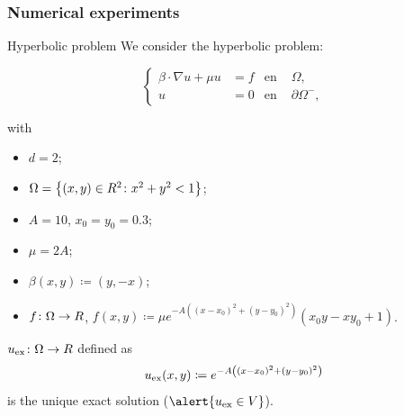 \subsubsection{Numerical experiments}
\begin{frame}{Hyperbolic problem}
	\scriptsize
	We consider the hyperbolic problem:
	\begin{block}{}
	\begin{equation*}
	\left\{
	\begin{aligned}
	\beta\cdot\nabla u+\mu u&=f & \text{en } &\Omega, \\
	u&=0 & \text{en } &\partial\Omega^-,
	\end{aligned}
	\right.
	\end{equation*}
	\end{block}
	with
	\begin{itemize}
		\item $d=2$;
		\item $\Omega=\left\{(x,y)\in\relax R^2\colon x^2+y^2<1 \right\}$;
		\item $A=10$, $x_0=y_0=0.3$;
		\item $\mu=2A$;
		\item $\beta(x,y)\coloneqq(y,-x)$;
		\item $f\colon\Omega\to\relax R$, $f(x,y)\coloneqq \mu e^{-A\left((x-x_0)^2+(y-y_0)^2\right)}(x_0 y -x y_0 + 1)$.
	\end{itemize}
	
	\vspace*{0.3cm}
	$u_{\text{ex}}\colon\Omega\to\relax R$ defined as
	\begin{equation*}
	u_{\text{ex}} (x,y)\coloneqq e^{-A\left((x-x_0)^2+(y-y_0)^2\right)}
	\end{equation*}
	is the \alert{unique exact solution} ($\alert{u_\text{ex}\in V}$).
	
	\end{frame}

